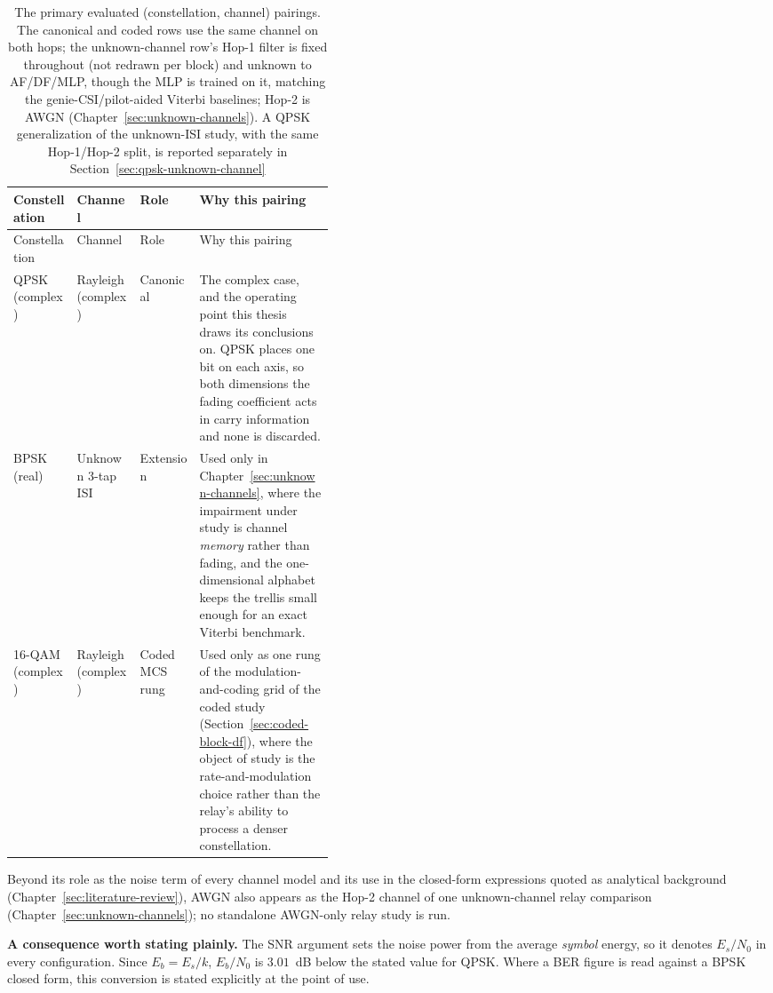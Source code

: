 \begin{longtable}[]{@{}lllp{0.42\linewidth}@{}}
\caption[The evaluated configurations]{The primary evaluated (constellation, channel) pairings. The canonical and coded rows use the same channel on both hops; the unknown-channel row's Hop-1 filter is fixed throughout (not redrawn per block) and unknown to AF/DF/MLP, though the MLP is trained on it, matching the genie-CSI/pilot-aided Viterbi baselines; Hop-2 is AWGN (Chapter~\ref{sec:unknown-channels}). A QPSK generalization of the unknown-ISI study, with the same Hop-1/Hop-2 split, is reported separately in Section~\ref{sec:qpsk-unknown-channel}}\label{tbl:configurations}\tabularnewline
\toprule\noalign{}
Constellation & Channel & Role & Why this pairing \\
\midrule\noalign{}
\endfirsthead
\toprule\noalign{}
Constellation & Channel & Role & Why this pairing \\
\midrule\noalign{}
\endhead
\bottomrule\noalign{}
\endlastfoot
QPSK (complex) & Rayleigh (complex) & Canonical & The complex case, and the operating point this thesis draws its conclusions on. QPSK places one bit on each axis, so both dimensions the fading coefficient acts in carry information and none is discarded. \\
BPSK (real) & Unknown 3-tap ISI & Extension & Used only in Chapter~\ref{sec:unknown-channels}, where the impairment under study is channel \emph{memory} rather than fading, and the one-dimensional alphabet keeps the trellis small enough for an exact Viterbi benchmark. \\
16-QAM (complex) & Rayleigh (complex) & Coded MCS rung & Used only as one rung of the modulation-and-coding grid of the coded study (Section~\ref{sec:coded-block-df}), where the object of study is the rate-and-modulation choice rather than the relay's ability to process a denser constellation. \\
\end{longtable}

Beyond its role as the noise term of every channel model and its use in the closed-form expressions quoted as analytical background (Chapter~\ref{sec:literature-review}), AWGN also appears as the Hop-2 channel of one unknown-channel relay comparison (Chapter~\ref{sec:unknown-channels}); no standalone AWGN-only relay study is run.

\textbf{A consequence worth stating plainly.} The SNR argument sets the noise power from the average \emph{symbol} energy, so it denotes \(E_s/N_0\) in every configuration. Since \(E_b = E_s/k\), \(E_b/N_0\) is \(3.01\)~dB below the stated value for QPSK. Where a BER figure is read against a BPSK closed form, this conversion is stated explicitly at the point of use.

